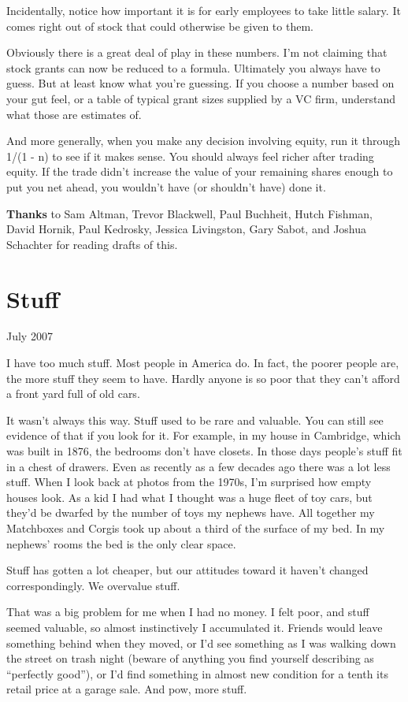 \documentclass[12pt]{book}
\begin{document}
Incidentally, notice how important it is for early employees to take
little salary. It comes right out of stock that could otherwise be given
to them.

Obviously there is a great deal of play in these numbers. I'm not
claiming that stock grants can now be reduced to a formula. Ultimately
you always have to guess. But at least know what you're guessing. If you
choose a number based on your gut feel, or a table of typical grant
sizes supplied by a VC firm, understand what those are estimates of.

And more generally, when you make any decision involving equity, run it
through 1/(1 - n) to see if it makes sense. You should always feel
richer after trading equity. If the trade didn't increase the value of
your remaining shares enough to put you net ahead, you wouldn't have (or
shouldn't have) done it.


\textbf{Thanks} to Sam Altman, Trevor Blackwell, Paul Buchheit, Hutch
Fishman, David Hornik, Paul Kedrosky, Jessica Livingston, Gary Sabot,
and Joshua Schachter for reading drafts of this.
\chapter{Stuff}

July 2007

I have too much stuff. Most people in America do. In fact, the poorer
people are, the more stuff they seem to have. Hardly anyone is so poor
that they can't afford a front yard full of old cars.

It wasn't always this way. Stuff used to be rare and valuable. You can
still see evidence of that if you look for it. For example, in my house
in Cambridge, which was built in 1876, the bedrooms don't have closets.
In those days people's stuff fit in a chest of drawers. Even as recently
as a few decades ago there was a lot less stuff. When I look back at
photos from the 1970s, I'm surprised how empty houses look. As a kid I
had what I thought was a huge fleet of toy cars, but they'd be dwarfed
by the number of toys my nephews have. All together my Matchboxes and
Corgis took up about a third of the surface of my bed. In my nephews'
rooms the bed is the only clear space.

Stuff has gotten a lot cheaper, but our attitudes toward it haven't
changed correspondingly. We overvalue stuff.

That was a big problem for me when I had no money. I felt poor, and
stuff seemed valuable, so almost instinctively I accumulated it. Friends
would leave something behind when they moved, or I'd see something as I
was walking down the street on trash night (beware of anything you find
yourself describing as ``perfectly good''), or I'd find something in
almost new condition for a tenth its retail price at a garage sale. And
pow, more stuff.
\end{document}
